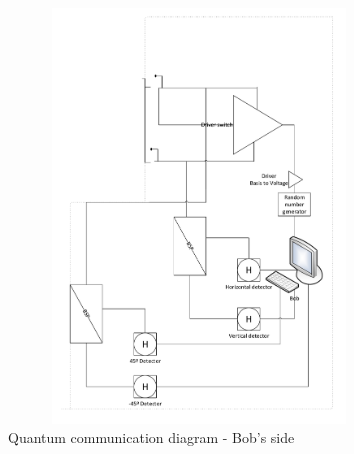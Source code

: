 \begin{figure}[H]
	\centering \includegraphics[width=0.9\textwidth,height=11cm]{./sdf/ot_with_discrete_variables/figures/OT_experimental_bob.pdf}
	\caption{Quantum communication diagram - Bob's side}\label{quantumchannelcommunication2}
\end{figure} 